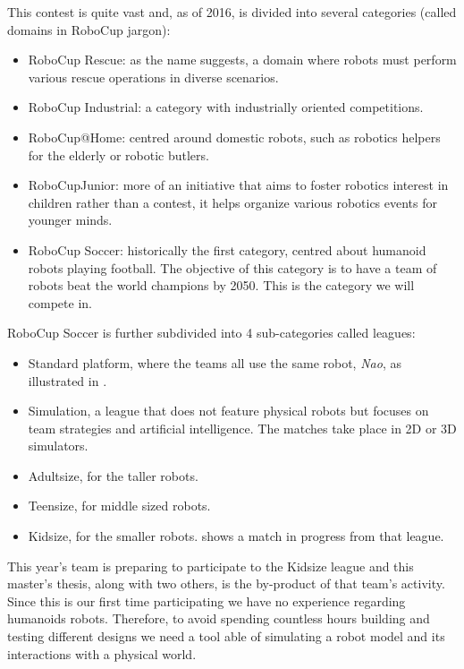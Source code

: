 This contest is quite vast and, as of 2016, is divided into several categories (called domains in RoboCup jargon):
\begin{itemize}
\item RoboCup Rescue: as the name suggests, a domain where robots must perform various rescue operations in diverse scenarios.
\item RoboCup Industrial: a category with industrially oriented competitions.
\item RoboCup@Home: centred around domestic robots, such as robotics helpers for the elderly or robotic butlers.
\item RoboCupJunior: more of an initiative that aims to foster robotics interest in children rather than a contest, it helps organize various robotics events for younger minds.
\item RoboCup Soccer: historically the first category, centred about humanoid robots playing football. The objective of this category is to have a team of robots beat the world champions by 2050. This is the category we will compete in.
\end{itemize}

RoboCup Soccer is further subdivided into 4 sub-categories called leagues:\begin{itemize}
\item Standard platform, where the teams all use the same robot, \emph{Nao}, as illustrated in .
\item Simulation, a league that does not feature physical robots but focuses on team strategies and artificial intelligence. The matches take place in 2D or 3D simulators.
\item Adultsize, for the taller robots.
\item Teensize, for middle sized robots.
\item Kidsize, for the smaller robots.  shows a match in progress from that league.
\end{itemize}

This year's team is preparing to participate to the Kidsize league and this master's thesis, along with two others, is the by-product of that team's activity. Since this is our first time participating we have no experience regarding humanoids robots. Therefore, to avoid spending countless hours building and testing different designs we need a tool able of simulating a robot model and its interactions with a physical world.  

